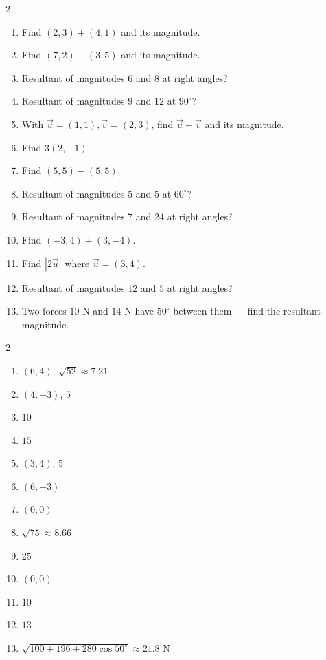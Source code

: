 \documentclass[11pt]{article}
\begin{document}
\begin{recapbox}
\begin{multicols}{2}
\small
\begin{enumerate}[leftmargin=*,itemsep=3pt]
  \item Find $(2,3)+(4,1)$ and its magnitude.
  \item Find $(7,2)-(3,5)$ and its magnitude.
  \item Resultant of magnitudes $6$ and $8$ at right angles?
  \item Resultant of magnitudes $9$ and $12$ at $90^\circ$?
  \item With $\vec u=(1,1),\vec v=(2,3)$, find $\vec u+\vec v$ and its magnitude.
  \item Find $3(2,-1)$.
  \item Find $(5,5)-(5,5)$.
  \item Resultant of magnitudes $5$ and $5$ at $60^\circ$?
  \item Resultant of magnitudes $7$ and $24$ at right angles?
  \item Find $(-3,4)+(3,-4)$.
  \item Find $|2\vec u|$ where $\vec u=(3,4)$.
  \item Resultant of magnitudes $12$ and $5$ at right angles?
  \item Two forces $10$ N and $14$ N have $50^\circ$ between them — find the resultant magnitude.
\end{enumerate}
\end{multicols}
\end{recapbox}

\begin{keybox}
\begin{multicols}{2}
\small
\begin{enumerate}[leftmargin=*,itemsep=3pt]
  \item $(6,4)$, $\sqrt{52}\approx7.21$
  \item $(4,-3)$, $5$
  \item $10$
  \item $15$
  \item $(3,4)$, $5$
  \item $(6,-3)$
  \item $(0,0)$
  \item $\sqrt{75}\approx8.66$
  \item $25$
  \item $(0,0)$
  \item $10$
  \item $13$
  \item $\sqrt{100+196+280\cos50^\circ}\approx21.8$ N
\end{enumerate}
\end{multicols}
\end{keybox}
\end{document}
